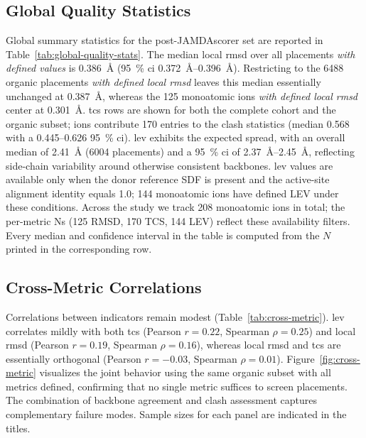\subsection{Global Quality Statistics}
\label{subsec:global-quality-stats}
Global summary statistics for the post-JAMDAscorer set are reported in Table~\ref{tab:global-quality-stats}. The median local \gls{rmsd} over all placements \emph{with defined values} is \SI{0.386}{\angstrom} (\SI{95}{\percent} \gls{ci} \SIrange{0.372}{0.396}{\angstrom}). Restricting to the \num{6488} organic placements \emph{with defined local \gls{rmsd}} leaves this median essentially unchanged at \SI{0.387}{\angstrom}, whereas the \num{125} monoatomic ions \emph{with defined local \gls{rmsd}} center at \SI{0.301}{\angstrom}. \gls{tcs} rows are shown for both the complete cohort and the organic subset; ions contribute \num{170} entries to the clash statistics (median 0.568 with a \SIrange{0.445}{0.626}{} \SI{95}{\percent} \gls{ci}). \gls{lev} exhibits the expected spread, with an overall median of \SI{2.41}{\angstrom} (\num{6004} placements) and a \SI{95}{\percent} \gls{ci} of \SIrange{2.37}{2.45}{\angstrom}, reflecting side-chain variability around otherwise consistent backbones. \gls{lev} values are available only when the donor reference SDF is present and the active-site alignment identity equals 1.0; \num{144} monoatomic ions have defined LEV under these conditions. Across the study we track \num{208} monoatomic ions in total; the per-metric Ns (\num{125} RMSD, \num{170} TCS, \num{144} LEV) reflect these availability filters. Every median and confidence interval in the table is computed from the $N$ printed in the corresponding row.



\subsection{Cross-Metric Correlations}
\label{subsec:cross-metric-correlations}
Correlations between indicators remain modest (Table~\ref{tab:cross-metric}). \gls{lev} correlates mildly with both \gls{tcs} (Pearson $r=0.22$, Spearman $\rho=0.25$) and local \gls{rmsd} (Pearson $r=0.19$, Spearman $\rho=0.16$), whereas local \gls{rmsd} and \gls{tcs} are essentially orthogonal (Pearson $r=-0.03$, Spearman $\rho=0.01$). Figure~\ref{fig:cross-metric} visualizes the joint behavior using the same organic subset with all metrics defined, confirming that no single metric suffices to screen placements. The combination of backbone agreement and clash assessment captures complementary failure modes. Sample sizes for each panel are indicated in the titles.

